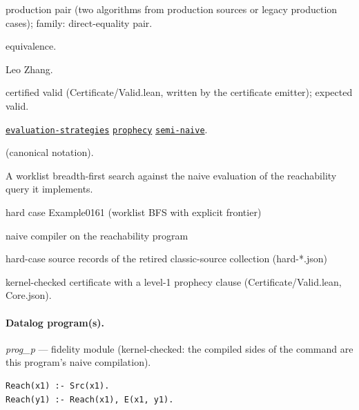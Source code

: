 \documentclass[10pt]{article}
\begin{document}
\begin{description}[leftmargin=2.6cm,style=nextline,itemsep=1pt]

\item[Category] production pair (two algorithms from production sources or legacy production cases); family: direct-equality pair.

\item[Kind] equivalence.

\item[Contributors] Leo Zhang.

\item[Status] certified valid (Certificate/Valid.lean, written by the certificate emitter); expected valid.

\item[Tags] \hyperref[tag:evaluation-strategies]{\texttt{evaluation-strategies}} \hyperref[tag:prophecy]{\texttt{prophecy}} \hyperref[tag:semi-naive]{\texttt{semi-naive}}.

\item[Input]  (canonical notation).

\item[Summary] A worklist breadth-first search against the naive evaluation of the reachability query it implements.

\item[Sides] hard case Example0161 (worklist BFS with explicit frontier) \par naive compiler on the reachability program

\item[Sources] {\raggedright hard-case source records of the retired classic-source collection (hard-*.json)\par}

\item[Prophecy] kernel-checked certificate with a level-1 prophecy clause (Certificate/Valid.lean, Core.json).

\end{description}

\paragraph{Datalog program(s).}

{\raggedright\textit{prog\_p} --- fidelity module (kernel-checked: the compiled sides of the command are this program's naive compilation).\par}

\begin{Verbatim}[fontsize=\scriptsize,breaklines=true,breakanywhere=true,frame=single,framesep=1.5mm]
Reach(x1) :- Src(x1).
Reach(y1) :- Reach(x1), E(x1, y1).
\end{Verbatim}
\end{document}
